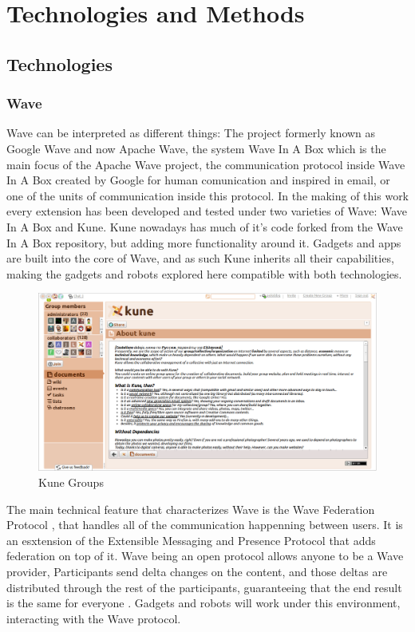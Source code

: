 \newpage
\section{Technologies and Methods}

\subsection{Technologies}
\subsubsection{Wave}
Wave can be interpreted as different things: The project formerly known as Google Wave and now Apache Wave, the system Wave In A Box which is the main focus of the Apache Wave project, the communication protocol inside Wave In A Box created by Google for human comunication and inspired in email, or one of the units of communication inside this protocol. In the making of this work every extension has been developed and tested under two varieties of Wave: Wave In A Box and Kune. Kune nowadays has much of it's code forked from the Wave In A Box repository, but adding more functionality around it. Gadgets and apps are built into the core of Wave, and as such Kune inherits all their capabilities, making the gadgets and robots explored here compatible with both technologies.
\begin{figure}[H]
  \center
    \includegraphics[keepaspectratio, scale=0.26]{Media/Captures/Wave/Kune_Groups.png}
  \caption{Kune Groups}
  \label{fig:kune_groups}
\end{figure}
The main technical feature that characterizes Wave is the Wave Federation Protocol \cite{ref:wave_federated_protocol}, that handles all of the communication happenning between users. It is an esxtension of the Extensible Messaging and Presence Protocol \cite{ref:xmpp} that adds federation on top of it. Wave being an open protocol allows anyone to be a Wave provider, Participants send delta changes on the content, and those deltas are distributed through the rest of the participants, guaranteeing that the end result is the same for everyone \cite{ref:federating_websites_google_wave}. Gadgets and robots will work under this environment, interacting with the Wave protocol.

